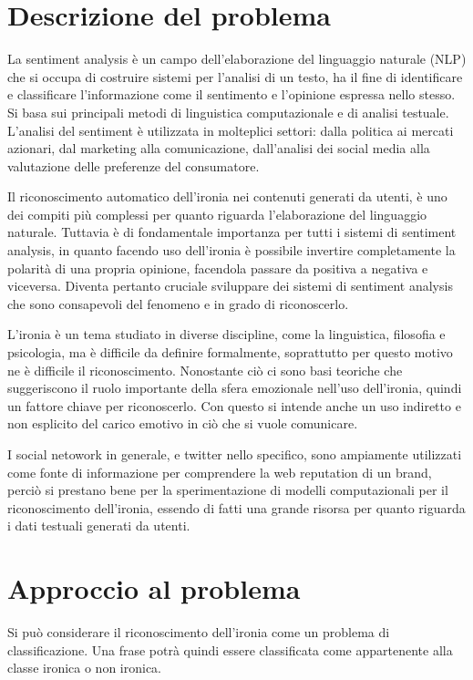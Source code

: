 \documentclass[oneside]{book}
\begin{document}
\section*{Descrizione del problema}

La sentiment analysis è un campo dell'elaborazione del linguaggio naturale (NLP) che si occupa di costruire sistemi per l'analisi di un testo, ha il fine di identificare e classificare l'informazione come il sentimento e l'opinione espressa nello stesso. Si basa sui principali metodi di linguistica computazionale e di analisi testuale. L'analisi del sentiment è utilizzata in molteplici settori: dalla politica ai mercati azionari, dal marketing alla comunicazione, dall'analisi dei social media alla valutazione delle preferenze del consumatore. 

Il riconoscimento automatico dell'ironia nei contenuti generati da utenti, è uno dei compiti più complessi per quanto riguarda l'elaborazione del linguaggio naturale. Tuttavia è di fondamentale importanza per tutti i sistemi di sentiment analysis, in quanto facendo uso dell'ironia è possibile invertire completamente la polarità di una propria opinione, facendola passare da positiva a negativa e viceversa.
Diventa pertanto cruciale sviluppare dei sistemi di sentiment analysis che sono consapevoli del fenomeno e in grado di riconoscerlo.

L'ironia è un tema studiato in diverse discipline, come la linguistica, filosofia e psicologia, ma è difficile da definire formalmente, soprattutto per questo motivo ne è difficile il riconoscimento. Nonostante ciò ci sono basi teoriche che suggeriscono il ruolo importante della sfera emozionale nell'uso dell'ironia, quindi un fattore chiave per riconoscerlo. Con questo si intende anche un uso indiretto e non esplicito del carico emotivo in ciò che si vuole comunicare.

I social netowork in generale, e twitter nello specifico, sono ampiamente utilizzati come fonte di informazione per comprendere la web reputation di un brand, perciò si prestano bene per la sperimentazione di modelli computazionali per il riconoscimento dell'ironia, essendo di fatti una grande risorsa per quanto riguarda i dati testuali generati da utenti.


\section*{Approccio al problema}
Si può considerare il riconoscimento dell'ironia come un problema di classificazione. Una frase potrà quindi essere classificata come appartenente alla classe ironica o non ironica.
\end{document}
